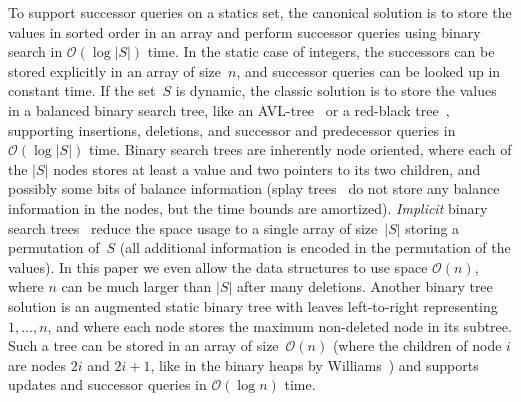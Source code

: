 \documentclass[a4paper]{lipics-v2021}
\newcommand{\Oh}{\mathcal{O}}
\begin{document}
To support successor queries on a statics set, the canonical solution is to store the values in sorted order in an array and perform successor queries using binary search in $\Oh(\log |S|)$ time. In the static case of integers, the successors can be stored explicitly in an array of size~$n$, and successor queries can be looked up in constant time. If the set~$S$ is dynamic, the classic solution is to store the values in a balanced binary search tree, like an AVL-tree~\cite{AVL62} or a red-black tree~\cite{GuibasSedgewick78}, supporting insertions, deletions, and successor and predecessor queries in $\Oh(\log |S|)$ time. Binary search trees are inherently node oriented, where each of the $|S|$ nodes stores at least a value and two pointers to its two children, and possibly some bits of balance information (splay trees~\cite{SleatorTarjan85} do not store any balance information in the nodes, but the time bounds are amortized). \emph{Implicit} binary search trees~\cite{FranceschiniG03,FranceschiniG06,Munro86} reduce the space usage to a single array of size~$|S|$ storing a permutation of~$S$ (all additional information is encoded in the permutation of the values). In this paper we even allow the data structures to use space $\Oh(n)$, where $n$ can be much larger than $|S|$ after many deletions. Another binary tree solution is an augmented static binary tree with leaves left-to-right representing~$1,\ldots,n$, and where each node stores the maximum non-deleted node in its subtree. Such a tree can be stored in an array of size~$\Oh(n)$ (where the children of node $i$ are nodes $2i$ and $2i+1$, like in the binary heaps by Williams~\cite{Williams64}) and supports updates and successor queries in $\Oh(\log n)$ time.
\end{document}
